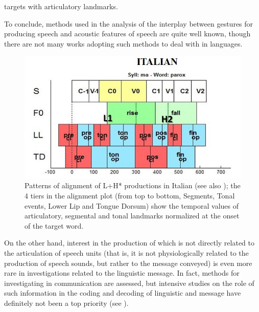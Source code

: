 \documentclass[output=paper]{langsci/langscibook}
\begin{document}
targets with articulatory landmarks. 

To conclude, methods used in the analysis of the interplay between gestures for producing speech and acoustic features of speech are quite well known, \linebreak though there are not many works adopting such methods to deal with  in  languages. 


\begin{figure}
\includegraphics[width=\textwidth]{figures/GIL-img5.jpg}
\caption{Patterns of alignment of L+H* productions in Italian (see also \citealt{Stella2014}); the 4 tiers in the alignment plot (from top to bottom, Segments, Tonal events, Lower Lip and Tongue Dorsum) show the temporal values of articulatory, segmental and tonal landmarks normalized at the onset of the target word.}
\label{fig:gil:3}
\end{figure}\pagebreak

On the other hand, interest in the production of  which is not directly related to the articulation of speech units (that is, it is not physiologically related to the production of speech sounds, but rather to the message conveyed) is even more rare in investigations related to the linguistic message. In fact, methods for investigating  in communication are assessed, but intensive studies on the role of such information in the coding and decoding of linguistic  and message have definitely not been a top priority (see ).
\end{document}
